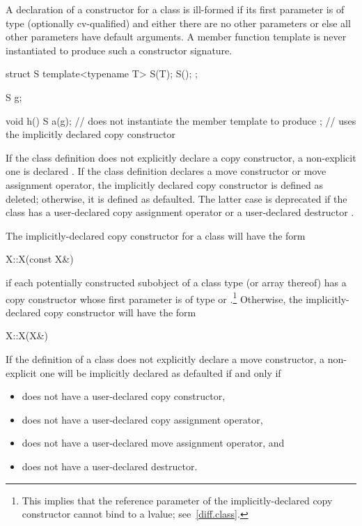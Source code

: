 \pnum
A declaration of a constructor for a class
is ill-formed if its first parameter is of type (optionally cv-qualified)
and either there are no other parameters or else all other parameters have
default arguments.
A member function template is never instantiated to
produce such a constructor signature.
\begin{example}
\begin{codeblock}
struct S {
  template<typename T> S(T);
  S();
};

S g;

void h() {
  S a(g);           // does not instantiate the member template to produce ;
                    // uses the implicitly declared copy constructor
}
\end{codeblock}
\end{example}

\pnum
If the class definition does not explicitly declare a copy constructor,
a non-explicit one is declared .
If the class definition declares a move
constructor or move assignment operator, the implicitly declared copy
constructor is defined as deleted; otherwise, it is defined as
defaulted.
The latter case is deprecated if the class has a user-declared copy assignment
operator or a user-declared destructor .

\pnum
The implicitly-declared copy constructor for a class
will have the form
\begin{codeblock}
X::X(const X&)
\end{codeblock}
if each potentially constructed subobject of a class type
(or array thereof)
has a copy constructor whose first parameter is of type
or
.\footnote{This implies that the reference parameter of the
implicitly-declared copy constructor
cannot bind to a
lvalue; see~\ref{diff.class}.}
Otherwise, the implicitly-declared copy constructor will have the form
\begin{codeblock}
X::X(X&)
\end{codeblock}

\pnum
{}%
If the definition of a class  does not explicitly declare
a move constructor, a non-explicit one will be
implicitly declared as defaulted if and only if
\begin{itemize}
\item
{} does not have a user-declared copy constructor,

\item
{} does not have a user-declared copy assignment operator,

\item
{} does not have a user-declared move assignment operator, and

\item
{} does not have a user-declared destructor.
\end{itemize}

